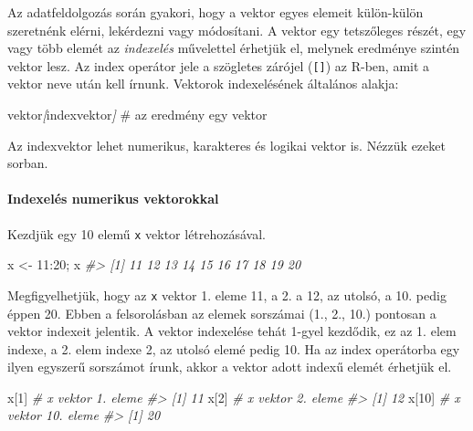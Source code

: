 \documentclass[
]{book}
\newenvironment{Shaded}{\begin{snugshade}}{\end{snugshade}}
\newcommand{\CommentTok}[1]{\textcolor[rgb]{0.56,0.35,0.01}{\textit{#1}}}
\newcommand{\DecValTok}[1]{\textcolor[rgb]{0.00,0.00,0.81}{#1}}
\newcommand{\NormalTok}[1]{#1}
\newcommand{\OtherTok}[1]{\textcolor[rgb]{0.56,0.35,0.01}{#1}}
\newcommand{\SpecialCharTok}[1]{\textcolor[rgb]{0.00,0.00,0.00}{#1}}
\begin{document}
Az adatfeldolgozás során gyakori, hogy a vektor egyes elemeit külön-külön szeretnénk elérni, lekérdezni vagy módosítani. A vektor egy tetszőleges részét, egy vagy több elemét az \emph{indexelés} művelettel érhetjük el, melynek eredménye szintén vektor lesz. Az index operátor jele a szögletes zárójel (\texttt{{[}{]}}) az R-ben, amit a vektor neve után kell írnunk. Vektorok indexelésének általános alakja:

\begin{Shaded}
\begin{Highlighting}[]
\NormalTok{vektor}\CommentTok{[}\OtherTok{indexvektor}\CommentTok{]}\NormalTok{        \# az eredmény egy vektor}
\end{Highlighting}
\end{Shaded}

Az indexvektor lehet numerikus, karakteres és logikai vektor is. Nézzük ezeket sorban.

\hypertarget{indexeluxe9s-numerikus-vektorokkal}{%
\paragraph{Indexelés numerikus vektorokkal}\label{indexeluxe9s-numerikus-vektorokkal}}

Kezdjük egy 10 elemű \texttt{x} vektor létrehozásával.

\begin{Shaded}
\begin{Highlighting}[]
\NormalTok{x }\OtherTok{\textless{}{-}} \DecValTok{11}\SpecialCharTok{:}\DecValTok{20}\NormalTok{; x}
\CommentTok{\#\textgreater{}  [1] 11 12 13 14 15 16 17 18 19 20}
\end{Highlighting}
\end{Shaded}

Megfigyelhetjük, hogy az \texttt{x} vektor 1. eleme 11, a 2. a 12, az utolsó, a 10. pedig éppen 20. Ebben a felsorolásban az elemek sorszámai (1., 2., 10.) pontosan a vektor indexeit jelentik. A vektor indexelése tehát 1-gyel kezdődik, ez az 1. elem indexe, a 2. elem indexe 2, az utolsó elemé pedig 10. Ha az index operátorba egy ilyen egyszerű sorszámot írunk, akkor a vektor adott indexű elemét érhetjük el.

\begin{Shaded}
\begin{Highlighting}[]
\NormalTok{x[}\DecValTok{1}\NormalTok{]     }\CommentTok{\# x vektor 1. eleme}
\CommentTok{\#\textgreater{} [1] 11}
\NormalTok{x[}\DecValTok{2}\NormalTok{]     }\CommentTok{\# x vektor 2. eleme}
\CommentTok{\#\textgreater{} [1] 12}
\NormalTok{x[}\DecValTok{10}\NormalTok{]    }\CommentTok{\# x vektor 10. eleme}
\CommentTok{\#\textgreater{} [1] 20}
\end{Highlighting}
\end{Shaded}
\end{document}
